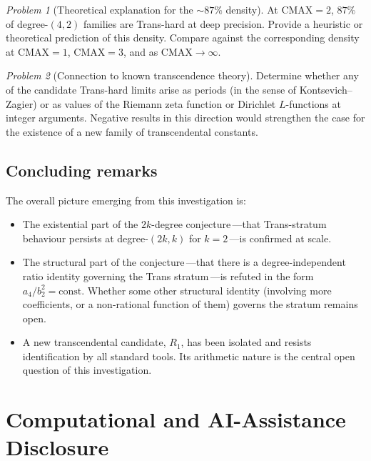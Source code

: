 \documentclass[11pt,a4paper]{amsart}
\theoremstyle{definition}
\theoremstyle{remark}
\newtheorem{problem}{Problem}
\begin{document}
\begin{problem}[Theoretical explanation for the $\sim87\%$ density]
\label{prob:density}
At $\mathrm{CMAX}=2$, $87\%$ of degree-$(4,2)$ families are
Trans-hard at deep precision.  Provide a heuristic or theoretical
prediction of this density.  Compare against the corresponding
density at $\mathrm{CMAX}=1$, $\mathrm{CMAX}=3$, and as
$\mathrm{CMAX}\to\infty$.
\end{problem}

\begin{problem}[Connection to known transcendence theory]
Determine whether any of the candidate Trans-hard limits arise as
periods (in the sense of Kontsevich--Zagier) or as values of the
Riemann zeta function or Dirichlet $L$-functions at integer
arguments.  Negative results in this direction would strengthen the
case for the existence of a new family of transcendental constants.
\end{problem}

\subsection{Concluding remarks}

The overall picture emerging from this investigation is:
\begin{itemize}
\item The existential part of the $2k$-degree conjecture\,---that
Trans-stratum behaviour persists at degree-$(2k,k)$ for $k=2$\,---is
confirmed at scale.
\item The structural part of the conjecture\,---that there is a
degree-independent ratio identity governing the Trans stratum\,---is
refuted in the form $a_4/b_2^2 = \mathrm{const}$.  Whether some other
structural identity (involving more coefficients, or a non-rational
function of them) governs the stratum remains open.
\item A new transcendental candidate, $R_1$, has been isolated and
resists identification by all standard tools.  Its arithmetic nature
is the central open question of this investigation.
\end{itemize}

\section*{Computational and AI-Assistance Disclosure}
\end{document}
